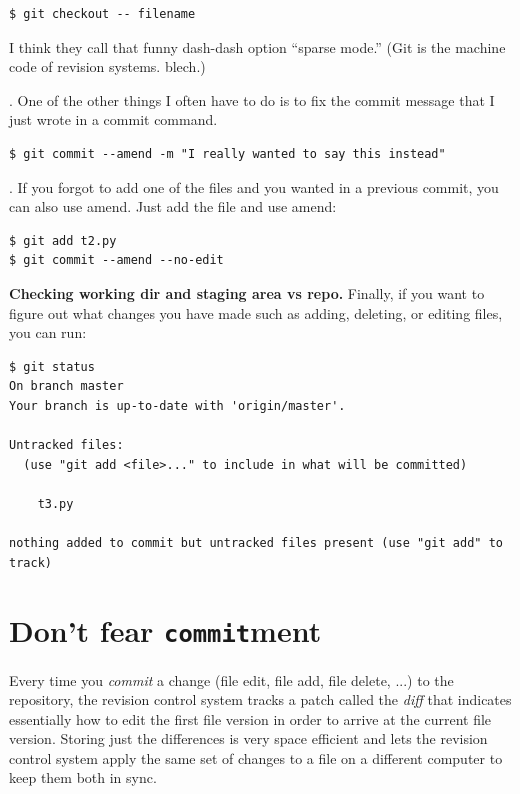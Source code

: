 \documentclass[titlepage]{tufte-book}
\begin{document}
\begin{lstlisting}[style=BashInputStyle]
$ git checkout -- filename
\end{lstlisting}

I think they call that funny dash-dash option ``sparse mode.'' (Git is the machine code of revision systems. blech.)

. One of the other things I often have to do is to fix the commit message that I just wrote in a commit command.

\begin{lstlisting}[style=BashInputStyle]
$ git commit --amend -m "I really wanted to say this instead"
\end{lstlisting}

. If you forgot to add one of the files and you wanted in a previous commit, you can also use amend. Just add the file and use amend:

\begin{lstlisting}[style=BashInputStyle]
$ git add t2.py
$ git commit --amend --no-edit
\end{lstlisting}

{\bf Checking working dir and staging area vs repo.} Finally, if you want to figure out what changes you have made such as adding, deleting, or editing files, you can run:

\begin{lstlisting}[style=BashInputStyle]
$ git status
On branch master
Your branch is up-to-date with 'origin/master'.

Untracked files:
  (use "git add <file>..." to include in what will be committed)

    t3.py

nothing added to commit but untracked files present (use "git add" to track)
\end{lstlisting}

\section{Don't fear {\tt commit}ment}

Every time you {\em commit} a change (file edit, file add, file delete, ...) to the repository, the revision control system tracks a patch called the {\em diff} that indicates essentially how to edit the first file version in order to arrive at the current file version. Storing just the differences is very space efficient and  lets the revision control system apply the same set of changes to a file on a different computer to keep them both in sync.  
\end{document}
